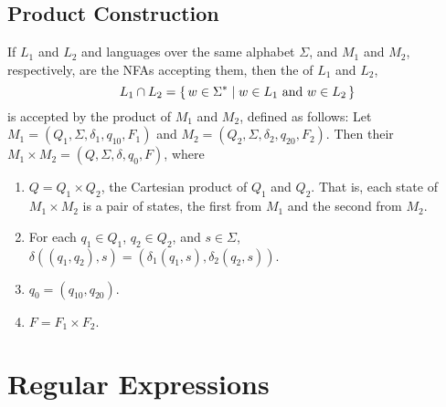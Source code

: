 \begin{Example}
\begin{center}
\end{center}
\end{Example}

\subsection{Product Construction}\label{subsec:ProductFA}

If $L_1$ and $L_2$ and languages over the same alphabet $\Sigma$, and $M_1$ and $M_2$, respectively, are the NFAs accepting them, then the  of $L_1$ and $L_2$,
\begin{equation*}
L_1 \cap L_2 = \qty{\, w \in \Sigma^* \mid w \in L_1 ~\text{and}~ w \in L_2 \,}
\end{equation*}
is accepted by the product of $M_1$ and $M_2$, defined as follows: Let $M_1 = (Q_1, \Sigma, \delta_1, q_{10}, F_1)$ and $M_2 = (Q_2, \Sigma, \delta_2, q_{20}, F_2)$. Then their  $M_1 \times M_2 = (Q, \Sigma, \delta, q_0, F)$, where
\begin{enumerate}[label = (\roman*)]
\item $Q = Q_1 \times Q_2$, the Cartesian product of $Q_1$ and $Q_2$. That is, each state of $M_1 \times M_2$ is a pair of states, the first from $M_1$ and the second from $M_2$.
\item For each $q_1 \in Q_1$, $q_2 \in Q_2$, and $s \in \Sigma$, $\delta((q_1, q_2), s) = (\delta_1(q_1, s), \delta_2(q_2, s))$.
\item $q_0 = (q_{10}, q_{20})$.
\item $F = F_1 \times F_2$.
\end{enumerate}

\section{Regular Expressions}\label{sec:RE}

